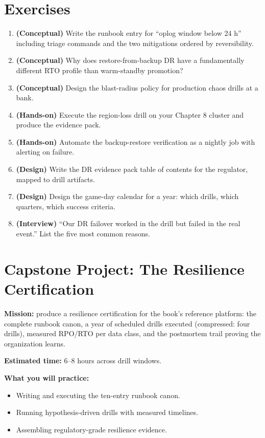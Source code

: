 \section{Exercises}
\begin{enumerate}
    \item \textbf{(Conceptual)} Write the runbook entry for ``oplog window below 24 h'' including triage commands and the two mitigations ordered by reversibility.
    \item \textbf{(Conceptual)} Why does restore-from-backup DR have a fundamentally different RTO profile than warm-standby promotion?
    \item \textbf{(Conceptual)} Design the blast-radius policy for production chaos drills at a bank.
    \item \textbf{(Hands-on)} Execute the region-loss drill on your Chapter 8 cluster and produce the evidence pack.
    \item \textbf{(Hands-on)} Automate the backup-restore verification as a nightly job with alerting on failure.
    \item \textbf{(Design)} Write the DR evidence pack table of contents for the regulator, mapped to drill artifacts.
    \item \textbf{(Design)} Design the game-day calendar for a year: which drills, which quarters, which success criteria.
    \item \textbf{(Interview)} ``Our DR failover worked in the drill but failed in the real event.'' List the five most common reasons.
\end{enumerate}

\section{Capstone Project: The Resilience Certification}\label{sec:ch23-capstone}

\begin{capstonebox}
\textbf{Mission:} produce a resilience certification for the book's reference platform: the complete runbook canon, a year of scheduled drills executed (compressed: four drills), measured RPO/RTO per data class, and the postmortem trail proving the organization learns.

\textbf{Estimated time:} 6--8 hours across drill windows.

\textbf{What you will practice:}
\begin{itemize}
    \item Writing and executing the ten-entry runbook canon.
    \item Running hypothesis-driven drills with measured timelines.
    \item Assembling regulatory-grade resilience evidence.
\end{itemize}
\end{capstonebox}


